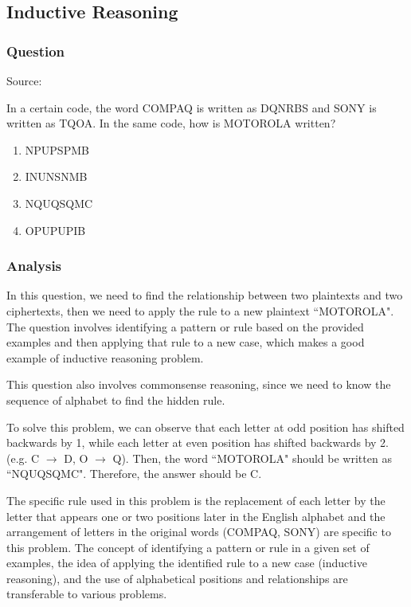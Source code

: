 \documentclass[12pt, a4paper]{article}
\begin{document}
\subsection*{Inductive Reasoning}
\subsubsection*{Question}
Source: \cite{Bhatia_2023b}

In a certain code, the word COMPAQ is written as DQNRBS and SONY is written as TQOA. In the same code, how is MOTOROLA written?

\begin{enumerate}[label=(\Alph*)]
    \item NPUPSPMB
    \item INUNSNMB
    \item NQUQSQMC
    \item OPUPUPIB
\end{enumerate}

\subsubsection*{Analysis}
In this question, we need to find the relationship between two plaintexts and two ciphertexts, then we need to apply the rule to a new plaintext ``MOTOROLA". The question involves identifying a pattern or rule based on the provided examples and then applying that rule to a new case, which makes a good example of inductive reasoning problem.

This question also involves commonsense reasoning, since we need to know the sequence of alphabet to find the hidden rule.

To solve this problem, we can observe that each letter at odd position has shifted backwards by 1, while each letter at even position has shifted backwards by 2. (e.g. C $\rightarrow$ D, O $\rightarrow$ Q). Then, the word ``MOTOROLA" should be written as ``NQUQSQMC". Therefore, the answer should be C.

The specific rule used in this problem is the replacement of each letter by the letter that appears one or two positions later in the English alphabet and the arrangement of letters in the original words (COMPAQ, SONY) are specific to this problem. The concept of identifying a pattern or rule in a given set of examples, the idea of applying the identified rule to a new case (inductive reasoning), and the use of alphabetical positions and relationships are transferable to various problems.
\end{document}
